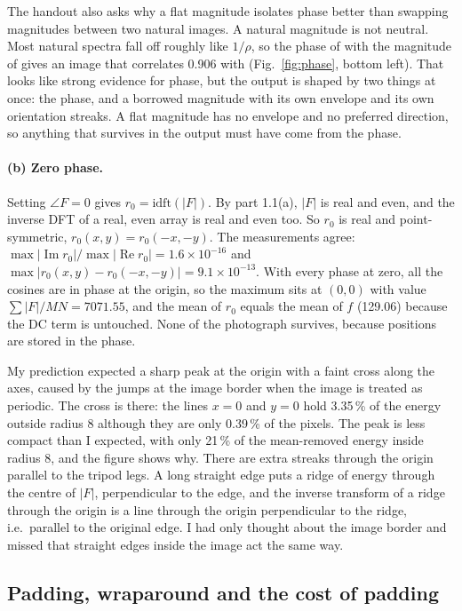 The handout also asks why a flat magnitude isolates phase better than swapping
magnitudes between two natural images. A natural magnitude is not neutral. Most
natural spectra fall off roughly like $1/\rho$, so the phase of  with
the magnitude of  gives an image that correlates 0.906 with
 (Fig.~\ref{fig:phase}, bottom left). That looks like strong evidence
for phase, but the output is shaped by two things at once: the phase, and a
borrowed magnitude with its own envelope and its own orientation streaks. A flat
magnitude has no envelope and no preferred direction, so anything that survives
in the output must have come from the phase.

\paragraph{(b) Zero phase.} Setting $\angle F=0$ gives $r_0=\text{idft}(|F|)$.
By part 1.1(a), $|F|$ is real and even, and the inverse DFT of a real, even
array is real and even too. So $r_0$ is real and point-symmetric,
$r_0(x,y)=r_0(-x,-y)$. The measurements agree:
$\max|\operatorname{Im}r_0|/\max|\operatorname{Re}r_0|=1.6\times10^{-16}$ and
$\max|r_0(x,y)-r_0(-x,-y)|=9.1\times10^{-13}$. With every phase at zero, all
the cosines are in phase at the origin, so the maximum sits at $(0,0)$ with
value $\sum|F|/MN=7071.55$, and the mean of $r_0$ equals the mean of $f$
(129.06) because the DC term is untouched. None of the photograph survives,
because positions are stored in the phase.

My prediction expected a sharp peak at the origin with a faint cross along the
axes, caused by the jumps at the image border when the image is treated as
periodic. The cross is there: the lines $x=0$ and $y=0$ hold 3.35\,\% of the
energy outside radius 8 although they are only 0.39\,\% of the pixels. The peak
is less compact than I expected, with only 21\,\% of the mean-removed energy
inside radius 8, and the figure shows why. There are extra streaks through the
origin parallel to the tripod legs. A long straight edge puts a ridge of energy
through the centre of $|F|$, perpendicular to the edge, and the inverse
transform of a ridge through the origin is a line through the origin
perpendicular to the ridge, i.e.\ parallel to the original edge. I had only
thought about the image border and missed that straight edges inside the image
act the same way.

\subsection{Padding, wraparound and the cost of padding}

